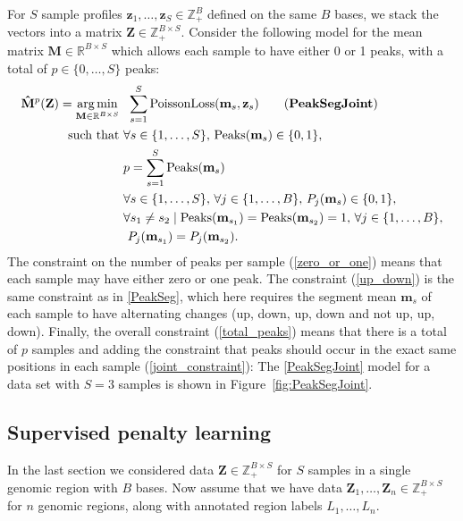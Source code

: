 \documentclass{article} %
\DeclareMathOperator*{\argmin}{arg\,min}
\DeclareMathOperator*{\Peaks}{Peaks}
\newcommand{\RR}{\mathbb R}
\newcommand{\ZZ}{\mathbb Z}
\begin{document}
For $S$ sample profiles $\mathbf z_1, \dots, \mathbf z_S\in\ZZ_+^B$
defined on the same $B$ bases, we stack the vectors into a matrix
$\mathbf Z\in\ZZ_+^{B \times S}$. Consider the following model for the
mean matrix $\mathbf M\in\RR^{B\times S}$ which allows each sample to
have either 0 or 1 peaks, with a total of $p\in\{0, \dots, S\}$ peaks:
\begin{align}
  \label{PeakSegJoint}
  \mathbf{\hat M}^p(\mathbf Z)  =
  \argmin_{\mathbf M\in\RR^{B\times S}} &\ \ 
  \sum_{s=1}^S 
  \text{PoissonLoss}(\mathbf m_s, \mathbf z_s) 
  \tag{\textbf{PeakSegJoint}}
  \\
  \text{such that} &\ 
  \forall s\in\{1, \dots, S\},\, 
  \Peaks(\mathbf m_s)\in\{0, 1\},  
  \label{zero_or_one}
  \\
  &\ 
  p = \sum_{s=1}^S \Peaks(\mathbf m_s)
  \label{total_peaks}
  \\
  &\ \forall s\in\{1, \dots, S\},\,
  \forall j\in\{1, \dots, B\},\, P_j(\mathbf m_s) \in\{0, 1\},
  \label{joint_up_down}
  \\
  &\ \forall s_1\neq s_2\mid
  \nonumber
  \Peaks(\mathbf m_{s_1})=\Peaks(\mathbf  m_{s_2})=1,\,
  \forall j\in\{1, \dots, B\},\\
  &\ \ P_j(\mathbf m_{s_1}) = P_j(\mathbf m_{s_2}).
  \label{joint_constraint}
\end{align}
The constraint on the number of peaks per
sample (\ref{zero_or_one}) means that each sample may have either zero
or one peak. 
The constraint (\ref{up_down}) is the same constraint
as in \ref{PeakSeg}, which here requires the segment mean $\mathbf
m_s$ of each sample to have alternating changes (up, down, up, down
and not up, up, down). Finally, the overall constraint (\ref{total_peaks}) means
that there is a total of $p$ samples 
and adding the constraint that peaks should occur in the exact same
positions in each sample (\ref{joint_constraint}):
The \ref{PeakSegJoint} model for a data set with $S=3$ samples is
shown in Figure~\ref{fig:PeakSegJoint}.

\subsection{Supervised penalty learning}

In the last section we considered data $\mathbf Z\in\ZZ_+^{B\times S}$
for $S$ samples in a single genomic region with $B$ bases. Now assume
that we have data $\mathbf Z_1,\dots, \mathbf Z_n\in\ZZ_+^{B\times S}$
for $n$ genomic regions, along with annotated region labels
$L_1,\dots, L_n$. 
\end{document}
